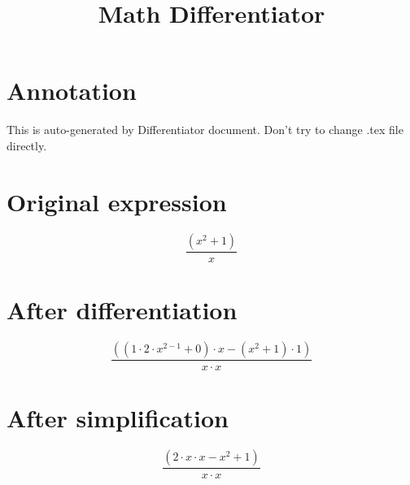 \documentclass[a4paper,12pt]{article}
\title{\textbf{Math Differentiator}}
\date{}
\author{\text{Kaplin Artyom, B01-402}}
\begin{document}
\maketitle

\section*{Annotation}
This is auto-generated by Differentiator document. Don't try to change .tex file directly.

\section*{Original expression}

\[\frac{\left({x}^{{2}}{+}{1}\right)}{{x}}\]

\section*{After differentiation}

\[\frac{\left(\left({1}{\cdot}{2}{\cdot}{x}^{{2}{-}{1}}{+}{0}\right){\cdot}{x}{-}\left({x}^{{2}}{+}{1}\right){\cdot}{1}\right)}{{x}{\cdot}{x}}\]

\section*{After simplification}

\[\frac{\left({2}{\cdot}{x}{\cdot}{x}{-}{x}^{{2}}{+}{1}\right)}{{x}{\cdot}{x}}\]
\end{document}
